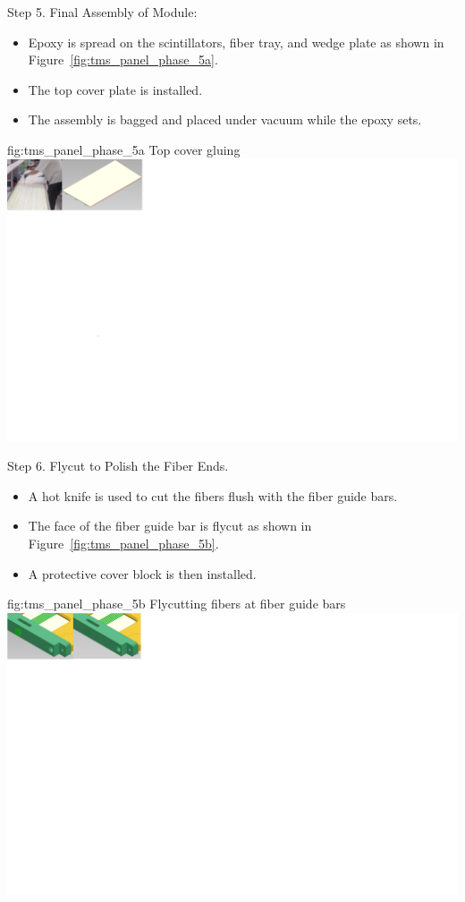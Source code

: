 Step 5.	Final Assembly of Module:%
\begin{itemize}
\item{Epoxy is spread on the scintillators, fiber tray, and wedge plate as shown in Figure~\ref{fig:tms_panel_phase_5a}.}
\item{The top cover plate is installed.}
\item{The assembly is bagged and placed under vacuum  while the epoxy sets.}
\end{itemize}
  
\begin{dunefigure}{fig:tms_panel_phase_5a}
{Top cover gluing}
\includegraphics[trim= 0 600 0 0 clip, width=3.1\textwidth]{graphics/tms/TMS-Other/phase5a.png}
\end{dunefigure}


Step 6.	Flycut to Polish the Fiber Ends.
\begin{itemize}
\item{A hot knife is used to cut the fibers flush with the fiber guide bars.}
\item{The face of the fiber guide bar is flycut as shown in Figure~\ref{fig:tms_panel_phase_5b}.}
\item{A protective cover block is then installed.}
\end{itemize}

\begin{dunefigure}{fig:tms_panel_phase_5b}
{Flycutting fibers at fiber guide bars}
\includegraphics[trim= 0 600 0 0 clip, width=3.1\textwidth]{graphics/tms/TMS-Other/phase5b.png}
\end{dunefigure}

